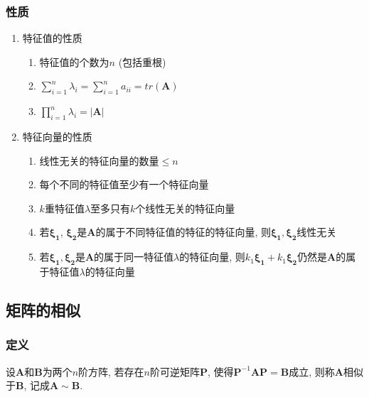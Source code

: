 \subsubsection{性质}
\begin{enumerate}
\item 特征值的性质
\begin{enumerate}
\item 特征值的个数为$n$ (包括重根)
\item $ \sum_{i=1}^{n}\lambda_{i}=\sum_{i=1}^{n}a_{ii}=tr(\bm{A}) $
\item $ \prod_{i=1}^{n}\lambda_{i}=\left| \bm{A}\right| $
\end{enumerate}
\item 特征向量的性质
\begin{enumerate}
\item 线性无关的特征向量的数量$\le n$
\item 每个不同的特征值至少有一个特征向量
\item $ k $重特征值$ \lambda $至多只有$ k $个线性无关的特征向量
\item 若$ \bm{\xi_1} $, $ \bm{\xi_2} $是$ \bm{A} $的属于不同特征值的特征的特征向量, 则$ \bm{\xi_1}, \bm{\xi_2} $线性无关
\item 若$ \bm{\xi_1}, \bm{\xi_2} $是$ \bm{A} $的属于同一特征值$ \lambda $的特征向量, 则$ k_1\bm{\xi_1} + k_1\bm{\xi_2} $仍然是$ \bm{A} $的属于特征值$ \lambda $的特征向量
\end{enumerate}
\end{enumerate}
\subsection{矩阵的相似}
\subsubsection{定义}
设$ \bm{A} $和$ \bm{B} $为两个$ n $阶方阵, 若存在$ n $阶可逆矩阵$ \bm{P} $, 使得$ \bm{P}^{-1}\bm{A}\bm{P}=\bm{B} $成立, 则称$ \bm{A} $相似于$ \bm{B} $, 记成$ \bm{A}\sim \bm{B} $.
